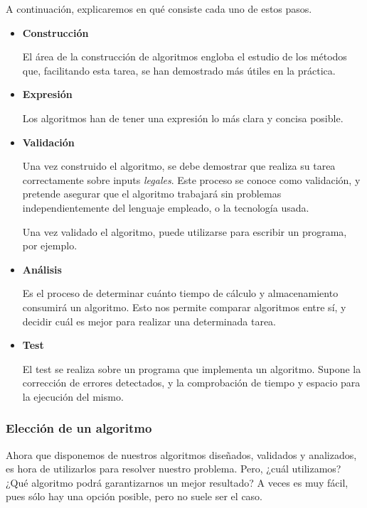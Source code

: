 \documentclass[11pt,a4paper]{article}
\begin{document}
A continuación, explicaremos en qué consiste cada uno de estos pasos.

\begin{itemize}
\item \textbf{Construcción}

El área de la construcción de algoritmos engloba el estudio de los métodos que, facilitando esta tarea, se han demostrado más útiles en la práctica.

\item \textbf{Expresión}

Los algoritmos han de tener una expresión lo más clara y concisa posible.

\item \textbf{Validación}

Una vez construido el algoritmo, se debe demostrar que realiza su tarea correctamente sobre inputs \textit{legales}. Este proceso se conoce como validación, y pretende asegurar  que el algoritmo trabajará sin problemas independientemente del lenguaje empleado, o la tecnología usada.

Una vez validado el algoritmo, puede utilizarse para escribir un programa, por ejemplo.

\item \textbf{Análisis}

Es el proceso de determinar cuánto tiempo de cálculo y almacenamiento consumirá un algoritmo. Esto nos permite comparar algoritmos entre sí, y decidir cuál es mejor para realizar una determinada tarea.

\item \textbf{Test}

El test se realiza sobre un programa que implementa un algoritmo. Supone la corrección de errores detectados, y la comprobación de tiempo y espacio para la ejecución del mismo.

\end{itemize}

\newpage

\subsubsection{Elección de un algoritmo}

Ahora que disponemos de nuestros algoritmos diseñados, validados y analizados, es hora de utilizarlos para resolver nuestro problema. Pero, ¿cuál utilizamos? ¿Qué algoritmo podrá garantizarnos un mejor resultado? A veces es muy fácil, pues sólo hay una opción posible, pero no suele ser el caso. 
\end{document}
